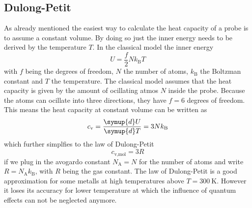 \subsection{Dulong-Petit}
As already mentioned the easiest way to calculate the heat capacity of a probe is to assume a constant volume.
By doing so just the inner energy needs to be derived by the temperature $T$.
In the classical model the inner energy
\begin{equation*}
    U = \frac{f}{2}Nk_\text{B}T
\end{equation*}
with $f$ being the degrees of freedom, $N$ the number of atoms, $k_\text{B}$ the Boltzman constant and $T$ the temperature.
The classical model assumes that the heat capacity is given by the amount of ocillating atmos $N$ inside the probe.
Because the atoms can ocillate into three directions, they have $f=6$ degrees of freedom.
This means the heat capacity at constant volume can be written as 
\begin{equation*}
    c_\text{v} = \frac{\symup{d}U}{\symup{d}T} = 3Nk_\text{B}
\end{equation*}
which further simplfies to the law of Dulong-Petit
\begin{equation}
    c_\text{v,mol} = 3R
    \label{eq:dulong}
\end{equation}
if we plug in the avogardo constant $N_\text{A} = N$ for the number of atoms and write $R = N_\text{A} k_\text{B}$, with $R$ being the gas constant.
The law of Dulong-Petit is a good approximation for some metalls at high temperatures above $T = \SI{300}{\K}$.
However it loses its accuracy for lower temperature at which the influence of quantum effects can not be neglected anymore.
